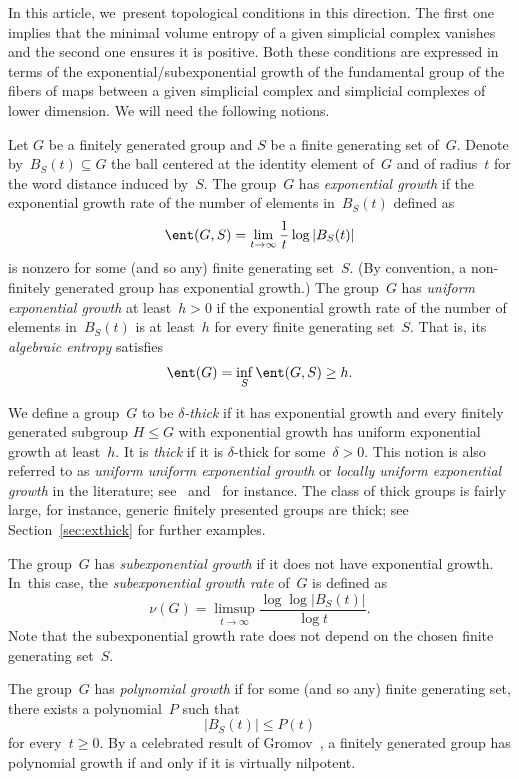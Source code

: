 In this article, we~present topological conditions in this direction.
The first one implies that the minimal volume entropy of a given simplicial complex vanishes and the second one ensures it is positive.
Both these conditions are expressed in terms of the exponential/subexponential growth of the fundamental group of the fibers of maps between a given simplicial complex and simplicial complexes of lower dimension.
We will need the following notions.

\begin{definition} \label{def:algent}
Let $G$ be a finitely generated group and $S$ be a finite generating set of~$G$.
Denote by~$B_S(t) \subseteq G$ the ball centered at the identity element of~$G$ and of radius~$t$ for the word distance induced by~$S$.
The group~$G$ has \emph{exponential growth} if the exponential growth rate of the number of elements in~$B_S(t)$ defined as
\[
\ent(G,S) = \lim_{t \to \infty} \frac{1}{t} \log | B_S(t) |
\]
is nonzero for some (and so any) finite generating set~$S$.
(By convention, a non-finitely generated group has exponential growth.)
The group~$G$ has \emph{uniform exponential growth} at least~$h>0$ if the exponential growth rate of the number of elements in~$B_S(t)$ is at least~$h$ for every finite generating set~$S$.
That is, its \emph{algebraic entropy} satisfies
\[
\ent(G) = \inf_S \ent(G,S) \geq h.
\]

We define a group~$G$ to be \emph{$\delta$-thick} if it has exponential growth and every finitely generated subgroup $H \leqslant G$ with exponential growth has uniform exponential growth at least~$h$.
It is \emph{thick} if it is $\delta$-thick for some~$\delta >0$.
This notion is also referred to as \emph{uniform uniform exponential growth} or \emph{locally uniform exponential growth} in the literature; see~\cite{GJN} and~\cite{man10} for instance.
The class of thick groups is fairly large, for instance, generic finitely presented groups are thick; see Section~\ref{sec:exthick} for further examples.

The group~$G$ has \emph{subexponential growth} if it does not have exponential growth. In~this case, the \emph{subexponential growth rate} of~$G$ is defined as
\[
\nu(G) = \limsup_{t \to \infty} \frac{\log \log |B_S(t)|}{\log t}.
\]
Note that the subexponential growth rate does not depend on the chosen finite generating set~$S$.

The group~$G$ has \emph{polynomial growth} if for some (and so any) finite generating set, there exists a polynomial~$P$ such that\vspace*{-3pt}
\[
|B_S(t)| \leq P(t)
\]
for every~$t \geq 0$.
By a celebrated result of Gromov~\cite{gro81}, a finitely generated group has polynomial growth if and only if it is virtually nilpotent.


\end{definition}
